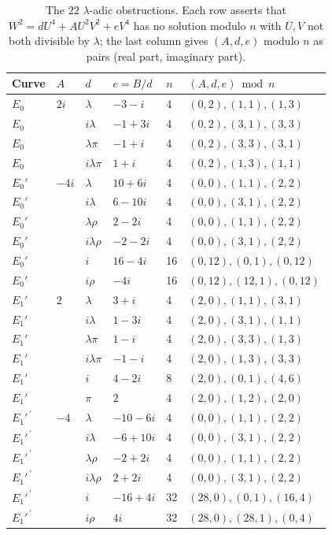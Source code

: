 \documentclass[10pt]{article}
\theoremstyle{definition}
\theoremstyle{remark}
\newcommand{\lam}{\lambda}
\newcommand{\pisym}{\pi}
\newcommand{\rhosym}{\rho}
\begin{document}
\begin{table}[ht]
\centering\small
\caption{The $22$ $\lam$-adic obstructions.  Each row asserts that
$W^2=dU^4+AU^2V^2+eV^4$ has no solution modulo $n$ with $U,V$ not both
divisible by $\lam$; the last column gives $(A,d,e)$ modulo $n$ as pairs
(real part, imaginary part).}\label{tab:lambda}
\begin{tabular}{@{}llllll@{}}
\toprule
Curve & $A$ & $d$ & $e=B/d$ & $n$ & $(A,d,e)\bmod n$\\
\midrule
$E_0$ & $2i$ & $\lam$ & $-3-i$ & 4 & $(0,2),(1,1),(1,3)$\\
$E_0$ & & $i\lam$ & $-1+3i$ & 4 & $(0,2),(3,1),(3,3)$\\
$E_0$ & & $\lam\pisym$ & $-1+i$ & 4 & $(0,2),(3,3),(3,1)$\\
$E_0$ & & $i\lam\pisym$ & $1+i$ & 4 & $(0,2),(1,3),(1,1)$\\
$E_0'$ & $-4i$ & $\lam$ & $10+6i$ & 4 & $(0,0),(1,1),(2,2)$\\
$E_0'$ & & $i\lam$ & $6-10i$ & 4 & $(0,0),(3,1),(2,2)$\\
$E_0'$ & & $\lam\rhosym$ & $2-2i$ & 4 & $(0,0),(1,1),(2,2)$\\
$E_0'$ & & $i\lam\rhosym$ & $-2-2i$ & 4 & $(0,0),(3,1),(2,2)$\\
$E_0'$ & & $i$ & $16-4i$ & 16 & $(0,12),(0,1),(0,12)$\\
$E_0'$ & & $i\rhosym$ & $-4i$ & 16 & $(0,12),(12,1),(0,12)$\\
$E_1'$ & $2$ & $\lam$ & $3+i$ & 4 & $(2,0),(1,1),(3,1)$\\
$E_1'$ & & $i\lam$ & $1-3i$ & 4 & $(2,0),(3,1),(1,1)$\\
$E_1'$ & & $\lam\pisym$ & $1-i$ & 4 & $(2,0),(3,3),(1,3)$\\
$E_1'$ & & $i\lam\pisym$ & $-1-i$ & 4 & $(2,0),(1,3),(3,3)$\\
$E_1'$ & & $i$ & $4-2i$ & 8 & $(2,0),(0,1),(4,6)$\\
$E_1'$ & & $\pisym$ & $2$ & 4 & $(2,0),(1,2),(2,0)$\\
$E_1'^{\,\prime}$ & $-4$ & $\lam$ & $-10-6i$ & 4 & $(0,0),(1,1),(2,2)$\\
$E_1'^{\,\prime}$ & & $i\lam$ & $-6+10i$ & 4 & $(0,0),(3,1),(2,2)$\\
$E_1'^{\,\prime}$ & & $\lam\rhosym$ & $-2+2i$ & 4 & $(0,0),(1,1),(2,2)$\\
$E_1'^{\,\prime}$ & & $i\lam\rhosym$ & $2+2i$ & 4 & $(0,0),(3,1),(2,2)$\\
$E_1'^{\,\prime}$ & & $i$ & $-16+4i$ & 32 & $(28,0),(0,1),(16,4)$\\
$E_1'^{\,\prime}$ & & $i\rhosym$ & $4i$ & 32 & $(28,0),(28,1),(0,4)$\\
\bottomrule
\end{tabular}
\end{table}
\end{document}
